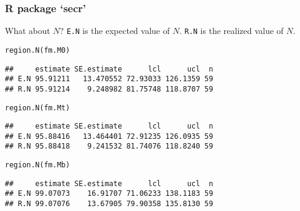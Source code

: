 \documentclass[color=usenames,dvipsnames]{beamer}\usepackage[]{graphicx}\usepackage[]{color}
\makeatletter
\newcommand{\hlstd}[1]{\textcolor[rgb]{0,0,0}{#1}}%
\newcommand{\hlkwd}[1]{\textcolor[rgb]{0.004,0.004,0.506}{#1}}%
\newenvironment{kframe}{%
 \def\at@end@of@kframe{}%
 \ifinner\ifhmode%
  \def\at@end@of@kframe{\end{minipage}}%
  \begin{minipage}{\columnwidth}%
 \fi\fi%
 \def\FrameCommand##1{\hskip\@totalleftmargin \hskip-\fboxsep
 \colorbox{shadecolor}{##1}\hskip-\fboxsep
     \hskip-\linewidth \hskip-\@totalleftmargin \hskip\columnwidth}%
 \MakeFramed {\advance\hsize-\width
   \@totalleftmargin\z@ \linewidth\hsize
   \@setminipage}}%
 {\par\unskip\endMakeFramed%
 \at@end@of@kframe}
\newenvironment{knitrout}{}{} %
\newcommand{\inr}[1]{\colorbox{inlinecolor}{\texttt{#1}}}
\makeatother
\begin{document}
\begin{frame}[fragile]
  \frametitle{R package `secr'}
  What about $N$? \pause \inr{E.N} is the expected value of
  $N$. \inr{R.N} is the realized value of $N$. 
  \vfill
\begin{knitrout}\footnotesize
{}\color{fgcolor}\begin{kframe}
\begin{alltt}
\hlkwd{region.N}\hlstd{(fm.M0)}
\end{alltt}
\begin{verbatim}
##     estimate SE.estimate      lcl      ucl  n
## E.N 95.91211   13.470552 72.93033 126.1359 59
## R.N 95.91214    9.248982 81.75748 118.8707 59
\end{verbatim}
\end{kframe}
\end{knitrout}
  \pause
\begin{knitrout}\footnotesize
{}\color{fgcolor}\begin{kframe}
\begin{alltt}
\hlkwd{region.N}\hlstd{(fm.Mt)}
\end{alltt}
\begin{verbatim}
##     estimate SE.estimate      lcl      ucl  n
## E.N 95.88416   13.464401 72.91235 126.0935 59
## R.N 95.88418    9.241532 81.74076 118.8240 59
\end{verbatim}
\end{kframe}
\end{knitrout}
  \pause
\begin{knitrout}\footnotesize
{}\color{fgcolor}\begin{kframe}
\begin{alltt}
\hlkwd{region.N}\hlstd{(fm.Mb)}
\end{alltt}
\begin{verbatim}
##     estimate SE.estimate      lcl      ucl  n
## E.N 99.07073    16.91707 71.06233 138.1183 59
## R.N 99.07076    13.67905 79.90358 135.8130 59
\end{verbatim}
\end{kframe}
\end{knitrout}
\end{frame}
\end{document}
